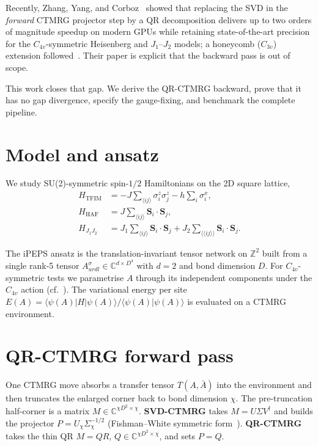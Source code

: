 \documentclass[aps,prb,reprint,amsmath,amssymb,superscriptaddress,floatfix]{revtex4-2}
\begin{document}
Recently, Zhang, Yang, and Corboz~\cite{Zhang2025qr} showed that replacing
the SVD in the \emph{forward} CTMRG projector step by a QR decomposition
delivers up to two orders of magnitude speedup on modern GPUs while
retaining state-of-the-art precision for the $C_{4v}$-symmetric Heisenberg
and $J_1$--$J_2$ models; a honeycomb ($C_{3v}$) extension
followed~\cite{Yang2025honeycomb}. Their paper is explicit that the
backward pass is out of scope.

This work closes that gap. We derive the QR-CTMRG backward, prove that it
has no gap divergence, specify the gauge-fixing, and benchmark the
complete pipeline.

\section{Model and ansatz}
\label{sec:model}

We study SU(2)-symmetric spin-$1/2$ Hamiltonians on the 2D square lattice,
\begin{align}
H_{\text{TFIM}} &= -J\sum_{\langle ij\rangle}\sigma^z_i\sigma^z_j - h\sum_i\sigma^x_i , \\
H_{\text{HAF}}  &= J\sum_{\langle ij\rangle}\bm S_i\cdot \bm S_j , \\
H_{J_1 J_2}     &= J_1\sum_{\langle ij\rangle}\bm S_i\cdot\bm S_j + J_2\sum_{\langle\!\langle ij\rangle\!\rangle}\bm S_i\cdot \bm S_j .
\end{align}

The iPEPS ansatz is the translation-invariant tensor network on
$\mathbb{Z}^2$ built from a single rank-5 tensor
$A^{\sigma}_{urdl}\in\mathbb{C}^{d\times D^4}$ with $d=2$ and bond
dimension $D$. For $C_{4v}$-symmetric tests we parametrise $A$ through its
independent components under the $C_{4v}$ action
(cf.~\cite{Zhang2025qr}). The variational energy per site
$E(A)=\langle\psi(A)|H|\psi(A)\rangle/\langle\psi(A)|\psi(A)\rangle$ is
evaluated on a CTMRG environment.

\section{QR-CTMRG forward pass}
\label{sec:forward}

One CTMRG move absorbs a transfer tensor $T(A,\bar A)$ into the environment
and then truncates the enlarged corner back to bond dimension $\chi$. The
pre-truncation half-corner is a matrix $M \in \mathbb{C}^{\chi D^2\times\chi}$.
\textbf{SVD-CTMRG} takes $M = U\Sigma V^\dagger$ and builds the projector
$P = U_\chi \Sigma_\chi^{-1/2}$ (Fishman--White symmetric
form~\cite{FishmanWhite2018}). \textbf{QR-CTMRG}~\cite{Zhang2025qr} takes
the thin QR $M = Q R$, $Q\in\mathbb{C}^{\chi D^2\times\chi}$, and sets
$P = Q$.
\end{document}
